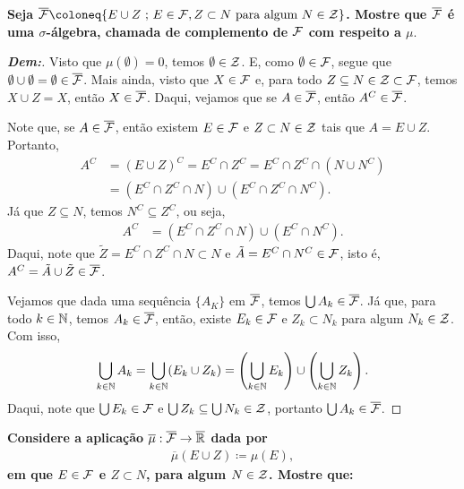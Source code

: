 \biglinend 
{}
\myexe{\thedois}
\bigline
\textbf{Seja $\overline{\mcal F} \coloneq \{E\cup Z\st E \in \mcal F, Z \subset N\text{ para algum }N\in \mcal Z\}$.
Mostre que $\overline{\mathcal F}$ é uma $\sigma$-álgebra, chamada de complemento de $\mathcal F$ com respeito a $\mu$}.
\begin{proof}[\textbf{Dem:}]
Visto que $\mu(\emptyset) = 0$, temos $\emptyset \in \mathcal Z$. E, como $\emptyset \in \mathcal F$, segue que 
  $\emptyset \cup \emptyset = \emptyset \in \overline{\mathcal F}$. Mais ainda, visto que $X \in \mathcal F$ e, 
  para todo $Z \subseteq N \in \mathcal Z \subset \mathcal F$, temos $X \cup Z = X$, então $X \in \overline{\mathcal F}$. 
  Daqui, vejamos que se $A \in \overline{\mathcal F}$, então $A^C \in \overline{\mathcal F}$.
  
  \noindent 
  Note que, se $A \in \overline{\mathcal F}$, então existem $E \in
  \mathcal F$ e $Z \subset N\in\mathcal Z$
  tais que $A = E \cup Z$. Portanto, 
  \begin{align*}
    A^C &= (E \cup Z)^C = E^C \cap Z^C = E^C\cap Z^C \cap (N \cup N^C)\\
    &= (E^C \cap Z^C \cap N) \cup (E^C \cap Z^C \cap N^C).
  \end{align*}
  Já que $Z \subseteq N$, temos $N^C \subseteq Z^C$, ou seja, 
  \begin{align*}
    A^C &= (E^C \cap Z^C \cap N) \cup (E^C \cap N^C).
  \end{align*}
  Daqui, note que $\tilde Z = E^C \cap Z^C \cap N \subset N$ e $\tilde A = E^C \cap N^C \in 
  \mathcal F$, isto é, $A^C = \tilde A \cup \tilde Z \in \overline{\mathcal F}$. 

  \noindent
  Vejamos que dada uma sequência $\{A_K\}$ em $\overline{\mathcal F}$,
  temos $\bigcup A_k \in \overline{\mathcal F}$. Já que, para todo 
  $k \in \mathbb N$, temos $A_k \in \overline{\mathcal F}$, então, existe $E_k \in \mathcal F$ e 
  $Z_k \subset N_k$ para algum $N_k \in \mathcal Z$. Com isso, 
  \begin{align*}
    \bigcup_{k \in \mathbb N} A_k = \bigcup_{k \in \mathbb N} (E_k \cup Z_k) = 
    \left(\bigcup_{k \in \mathbb N} E_k \right)\cup \left(\bigcup_{k \in \mathbb N} Z_k\right).
  \end{align*}
  Daqui, note que $\bigcup E_k \in \mathcal F$ e $\bigcup Z_k \subseteq 
  \bigcup N_k \in \mathcal Z$, portanto $\bigcup A_k \in \overline{\mathcal F}$.
\end{proof}
\biglinend 
{}
\myexe{\thedois}
\bigline
\textbf{Considere a aplicação $\overline \mu: \overline{\mathcal F} \rightarrow \overline {\mathbb R}$ dada por 
\begin{align*}
  \overline \mu (E\cup Z) \coloneq \mu(E),
\end{align*}
em que $E\in \mathcal F$ e $Z \subset N$, para algum $N \in \mathcal Z$. Mostre que:} 
